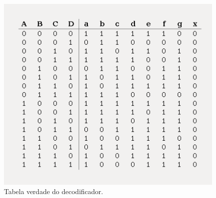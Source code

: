 \documentclass[
	12pt,				%
	openright,			%
	twoside,			%
	a4paper,			%
	english,			%
	french,				%
	spanish,			%
	brazil,				%
	]{abntex2}
\begin{document}
\begin{figure}[H]
	\begin{center}
	    \includegraphics[scale=0.8]{decodetab.png}
	\end{center}
\caption{\label{decodetabela}Tabela verdade do decodificador.}
\end{figure}
\end{document}
